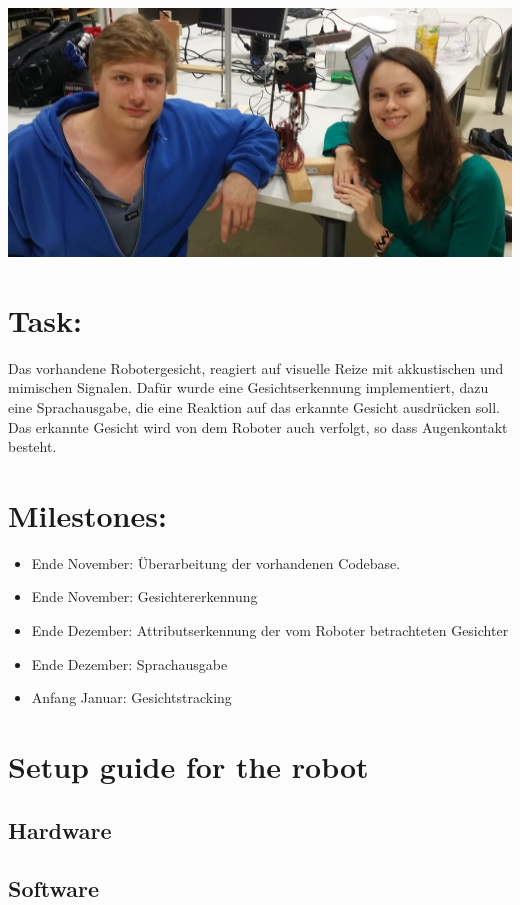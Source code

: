 \documentclass[12.5pt]{scrartcl}
\begin{document}
	\vspace*{8mm}
	\begin{center}
		\includegraphics[width=0.88\linewidth]{images/faceEdited}
	\end{center}
	
	\section{Task:}
	Das vorhandene Robotergesicht, reagiert auf visuelle Reize mit akkustischen und mimischen Signalen. Dafür wurde eine Gesichtserkennung implementiert, dazu eine Sprachausgabe, die eine Reaktion auf das erkannte Gesicht ausdrücken soll. Das erkannte Gesicht wird von dem Roboter auch verfolgt, so dass Augenkontakt besteht.
	
	\section{Milestones:}
	\begin{itemize}
		\item Ende November: Überarbeitung der vorhandenen Codebase.
		\item Ende November: Gesichtererkennung
		\item Ende Dezember: Attributserkennung der vom Roboter betrachteten Gesichter
		\item Ende Dezember: Sprachausgabe
		\item Anfang Januar: Gesichtstracking
	\end{itemize}

	\section{Setup guide for the robot}
	\subsection{Hardware}
	\subsection{Software}
\end{document}

